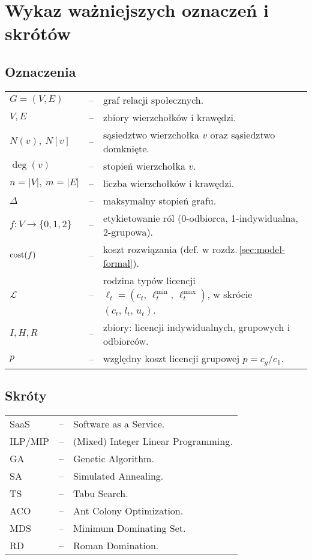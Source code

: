 \chapter*{Wykaz ważniejszych oznaczeń i skrótów}

\section*{Oznaczenia}

\begin{tabular}{@{} l l p{} @{}}
    $G=(V,E)$    & -- & graf relacji społecznych. \\
    $V,E$        & -- & zbiory wierzchołków i krawędzi. \\
    $N(v),\ N[v]$ & -- & sąsiedztwo wierzchołka $v$ oraz sąsiedztwo domknięte. \\
    $\deg(v)$    & -- & stopień wierzchołka $v$. \\
    $n=|V|,\ m=|E|$ & -- & liczba wierzchołków i krawędzi. \\
    $\Delta$     & -- & maksymalny stopień grafu. \\
    $f:V\to\{0,1,2\}$ & -- & etykietowanie ról (0-odbiorca, 1-indywidualna, 2-grupowa). \\
    $\operatorname{cost}(f)$   & -- & koszt rozwiązania (def. w rozdz.\,\ref{sec:model-formal}). \\
    $\mathcal{L}$ & -- & rodzina typów licencji $\ell_t=(c_t,\,\ell^{\min}_t,\,\ell^{\max}_t)$, w skrócie $(c_t,\,l_t,\,u_t)$. \\
    $I,H,R$      & -- & zbiory: licencji indywidualnych, grupowych i odbiorców. \\
    $p$          & -- & względny koszt licencji grupowej $p=c_g/c_1$. \\
\end{tabular}

\section*{Skróty}

\begin{tabular}{@{} l l p{} @{}}
    SaaS & -- & Software as a Service. \\
    ILP/MIP & -- & (Mixed) Integer Linear Programming. \\
    GA   & -- & Genetic Algorithm. \\
    SA   & -- & Simulated Annealing. \\
    TS   & -- & Tabu Search. \\
    ACO  & -- & Ant Colony Optimization. \\
    MDS  & -- & Minimum Dominating Set. \\
    RD   & -- & Roman Domination. \\
\end{tabular}
